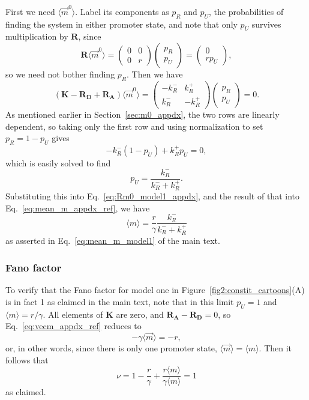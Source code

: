 First we need $\langle\vec{m}^0\rangle$. Label its components as $p_R$ and
$p_U$, the probabilities of finding the system in either promoter state, and
note that only $p_U$ survives multiplication by $\mathbf{R}$, since
\begin{equation}
\mathbf{R} \langle\vec{m}^0\rangle
= \begin{pmatrix} 0 & 0 \\ 0 & r \end{pmatrix}
    \begin{pmatrix} p_R \\ p_U \end{pmatrix}
= \begin{pmatrix} 0 \\ r p_U \end{pmatrix},
\label{eq:Rm0_model1_appdx}
\end{equation}
so we need not bother finding $p_R$. Then we have
\begin{equation}
(\mathbf{K} - \mathbf{R_D} + \mathbf{R_A}) \langle\vec{m}^0\rangle
= \begin{pmatrix} -k_R^- & k_R^+ \\ k_R^- & -k_R^+ \end{pmatrix}
    \begin{pmatrix} p_R \\ p_U \end{pmatrix} = 0.
\end{equation}
As mentioned earlier in Section~\ref{sec:m0_appdx}, the two rows are linearly
dependent, so taking only the first row and using normalization to set $p_R =
1-p_U$ gives
\begin{equation}
-k_R^- (1-p_U) + k_R^+ p_U = 0,
\end{equation}
which is easily solved to find
\begin{equation}
p_U = \frac{k_R^-}{k_R^- + k_R^+}.
\end{equation}
Substituting this into Eq.~\ref{eq:Rm0_model1_appdx}, and the result of that
into Eq.~\ref{eq:mean_m_appdx_ref}, we have
\begin{equation}
\langle{m}\rangle = \frac{r}{\gamma} \frac{k_R^-}{k_R^- + k_R^+}
\end{equation}
as asserted in Eq.~\ref{eq:mean_m_model1} of the main text.

\subsubsection{Fano factor}
To verify that the Fano factor for model one in
Figure~\ref{fig2:constit_cartoons}(A) is in fact 1 as claimed in the main text,
note that in this limit $p_U = 1$ and $\langle{m}\rangle = r/\gamma$. All
elements of $\mathbf{K}$ are zero, and $\mathbf{R_A}-\mathbf{R_D} = 0$, so
Eq.~\ref{eq:vecm_appdx_ref} reduces to
\begin{equation}
- \gamma \langle\vec{m}\rangle = - r,
\end{equation}
or, in other words, since there is only one promoter state,
$\langle\vec{m}\rangle = \langle{m}\rangle$. Then it follows that
\begin{equation}
\nu = 1 -\frac{r}{\gamma}
    + \frac{r \langle{m}\rangle}{\gamma \langle{m}\rangle}
= 1
\end{equation}
as claimed.

